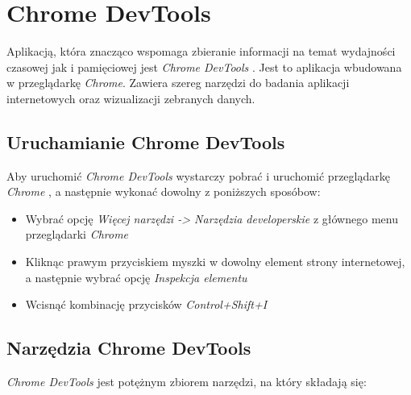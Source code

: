 \documentclass[polish, twoside, 12pt]{mwart}
\let\stdsection\section
\renewcommand*{\section}{\clearpage\stdsection}
\begin{document}
\section{Chrome DevTools}

Aplikacją, która znacząco wspomaga zbieranie informacji na temat wydajności czasowej jak i pamięciowej jest \emph{Chrome DevTools} \cite{chrome-devtools}. Jest to aplikacja wbudowana w przeglądarkę \emph{Chrome}. Zawiera szereg narzędzi do badania aplikacji internetowych oraz wizualizacji zebranych danych.

\subsection{Uruchamianie Chrome DevTools}

Aby uruchomić \emph{Chrome DevTools} wystarczy pobrać i uruchomić przeglądarkę \emph{Chrome} \cite{chrome}, a następnie wykonać dowolny z poniższych sposóbow:

\begin{itemize}
  \item Wybrać opcję \emph{Więcej narzędzi -> Narzędzia developerskie} z głównego menu przeglądarki \emph{Chrome}
  \item Kliknąc prawym przyciskiem myszki w dowolny element strony internetowej, a następnie wybrać opcję \emph{Inspekcja elementu}
  \item Wcisnąć kombinację przycisków \emph{Control+Shift+I}
\end{itemize}

\subsection{Narzędzia Chrome DevTools}

\emph{Chrome DevTools} jest potężnym zbiorem narzędzi, na który składają się:
\end{document}
